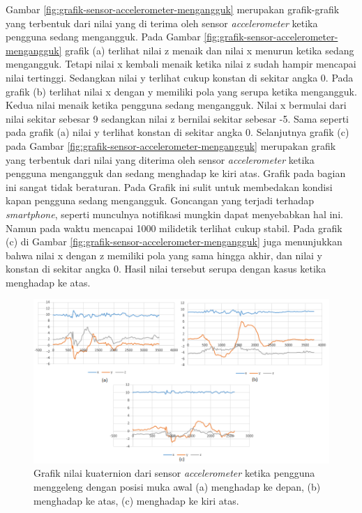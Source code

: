 Gambar \ref{fig:grafik-sensor-accelerometer-mengangguk} merupakan grafik-grafik yang terbentuk dari nilai yang di terima oleh sensor \textit{accelerometer} ketika pengguna sedang mengangguk. Pada Gambar \ref{fig:grafik-sensor-accelerometer-mengangguk} grafik (a) terlihat nilai z menaik dan nilai x menurun ketika sedang mengangguk. Tetapi nilai x kembali menaik ketika nilai z sudah hampir mencapai nilai tertinggi. Sedangkan nilai y terlihat cukup konstan di sekitar angka 0. Pada grafik (b) terlihat nilai x dengan y memiliki pola yang serupa ketika mengangguk. Kedua nilai menaik ketika pengguna sedang mengangguk. Nilai x bermulai dari nilai sekitar sebesar 9 sedangkan nilai z bernilai sekitar sebesar -5. Sama seperti pada grafik (a) nilai y terlihat konstan di sekitar angka 0. Selanjutnya grafik (c) pada Gambar \ref{fig:grafik-sensor-accelerometer-mengangguk} merupakan grafik yang terbentuk dari nilai yang diterima oleh sensor \textit{accelerometer} ketika pengguna mengangguk dan sedang menghadap ke kiri atas. Grafik pada bagian ini sangat tidak beraturan. Pada Grafik ini sulit untuk membedakan kondisi kapan pengguna sedang mengangguk. Goncangan yang terjadi terhadap \textit{smartphone}, seperti munculnya notifikasi mungkin dapat menyebabkan hal ini. Namun pada waktu mencapai 1000 milidetik terlihat cukup stabil. Pada grafik (c) di Gambar \ref{fig:grafik-sensor-accelerometer-mengangguk} juga menunjukkan bahwa nilai x dengan z memiliki pola yang sama hingga akhir, dan nilai y konstan di sekitar angka 0. Hasil nilai tersebut serupa dengan kasus ketika menghadap ke atas. 


\begin{figure}[htbp]
\centering
\includegraphics[scale=0.6]{Gambar/grafik-sensor-accelerometer-menggeleng.png}
\caption{Grafik nilai kuaternion dari sensor \textit{accelerometer} ketika pengguna menggeleng dengan posisi muka awal (a) menghadap ke depan, (b) menghadap ke atas, (c) menghadap ke kiri atas.} 
\label{fig:grafik-sensor-accelerometer-menggeleng}
\end{figure}

